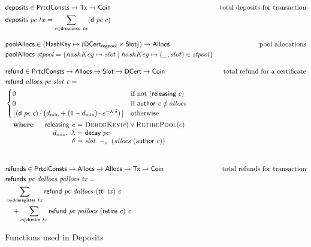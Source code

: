 \documentclass[11pt,a4paper]{article}
\newcommand{\Tx}{\type{Tx}}
\newcommand{\Coin}{\type{Coin}}
\newcommand{\PrtclConsts}{\type{PrtclConsts}}
\newcommand{\Slot}{\type{Slot}}
\newcommand{\Allocs}{\type{Allocs}}
\newcommand{\DCert}{\type{DCert}}
\newcommand{\DCertRegPool}{\type{DCert_{regpool}}}
\newcommand{\HashKey}{\type{HashKey}}
\newcommand{\ttl}[1]{\fun{ttl}~ \var{#1}}
\newcommand{\refund}[4]{\fun{refund}~ \var{#1}~ \var{#2}~ \var{#3}~ \var{#4}}
\newcommand{\refunds}[4]{\fun{refunds}~ \var{#1}~ \var{#2}~ \var{#3}~ \var{#4}}
\newcommand{\DeregKey}[1]{\textsc{DeregKey}(#1)}
\newcommand{\RetirePool}[1]{\textsc{RetirePool}(#1)}
\newcommand{\cauthor}[1]{\fun{author}~ \var{#1}}
\newcommand{\retire}[1]{\fun{retire}~ \var{#1}}
\newcommand{\slotminus}[2]{\var{#1}~-_{s}~\var{#2}}
\DeclarePairedDelimiter\floor{\lfloor}{\rfloor}
\theoremstyle{definition}
\theoremstyle{definition}
\begin{document}
\begin{figure}
  \begin{align*}
      & \fun{deposits} \in \PrtclConsts \to \Tx \to \Coin
      & \text{total deposits for transaction} \\
      & \fun{deposits}~{pc}~{tx} = \sum\limits_{c \in \fun{dresource}~tx} (\fun{d}~pc~c)
      \nextdef
      & \fun{poolAllocs} \in (\HashKey \mapsto (\DCertRegPool \times \Slot)) \to \Allocs
      & \text{pool allocations} \\
      & \fun{poolAllocs}~\var{stpool} =
          \{hashKey \mapsto slot \mid hashKey \mapsto (\_, slot) \in \var{stpool}\}
      \nextdef
      & \fun{refund} \in \PrtclConsts \to \Allocs \to \Slot \to \DCert \to \Coin
      & \text{total refund for a certificate} \\
      & \refund{allocs}{pc}{slot}{c} =\\
      & \begin{cases}
        0 & \text{if not}~(\fun{releasing}~c)\\
            0 & \text{if}~\cauthor c \notin allocs\\
            \floor*{
              \left(\fun{d}~pc~c\right) \cdot
            \left(d_{\min}+(1-d_{\min})\cdot e^{-\lambda\cdot\delta}\right)}
            & \text{otherwise}
        \end{cases}\\
      &
      \begin{array}{lr@{~=~}l}
        \where &\fun{releasing}~\var{c} & \DeregKey{c} \lor \RetirePool{c}\\
        & d_{\min},~\lambda & \fun{decay}~pc\\
        &\delta & \slotminus{slot}{(allocs~(\cauthor c))}\\
      \end{array}\\
      \nextdef
      & \fun{refunds} \in \PrtclConsts \to \Allocs \to \Allocs \to \Tx \to \Coin
      & \text{total refunds for transaction} \\
      & \refunds{pc}{dallocs}{pallocs}{tx} =\\
      &   \sum\limits_{c \in \fun{dderegister}~tx} \refund{pc}{dallocs}{(\ttl{tx})}{c}\\
      &   ~~~+ \sum\limits_{c \in \fun{dretire}~tx} \refund{pc}{pallocs}{(\retire{c})}{c}
  \end{align*}
  \caption{Functions used in Deposits}
  \label{fig:functions:deposits}
\end{figure}
\end{document}

